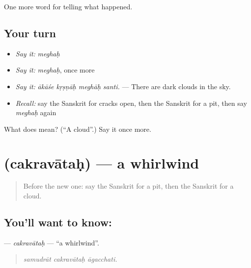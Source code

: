 \begin{grammarlens}[title={What you've built}]
One more word for telling what happened.
\end{grammarlens}

\subsection*{Your turn}
\begin{itemize}
\raggedright
  \item \emph{Say it:} \emph{meghaḥ}
  \item \emph{Say it:} \emph{meghaḥ}, once more
  \item \emph{Say it:} \emph{ākāśe kṛṣṇāḥ meghāḥ santi.} — There are dark clouds in the sky.
  \item \emph{Recall:} say the Sanskrit for cracks open, then the Sanskrit for a pit, then say \emph{meghaḥ} again
\end{itemize}

\begin{tcolorbox}[breakable,colback=teal!4,colframe=teal!35!black,title={Before you move on}]
What does  mean? (\textquotedblleft{}A cloud\textquotedblright{}.) Say it once more.
\end{tcolorbox}
\section[\texorpdfstring{\sk{चक्रवातः} (cakravātaḥ)}{चक्रवातः (cakravātaḥ)}]{ (cakravātaḥ) — a whirlwind}

\label{lesson:SA-C301-cakravatah}



\begin{quote}
Before the new one: say the Sanskrit for a pit, then the Sanskrit for a cloud.
\end{quote}

\subsection*{You'll want to know: }
\textbf{} — \emph{cakravātaḥ} — \textquotedblleft{}a whirlwind\textquotedblright{}.

\begin{quote}
  
\end{quote}

\begin{quote}
\emph{samudrāt cakravātaḥ āgacchati.}
\end{quote}

